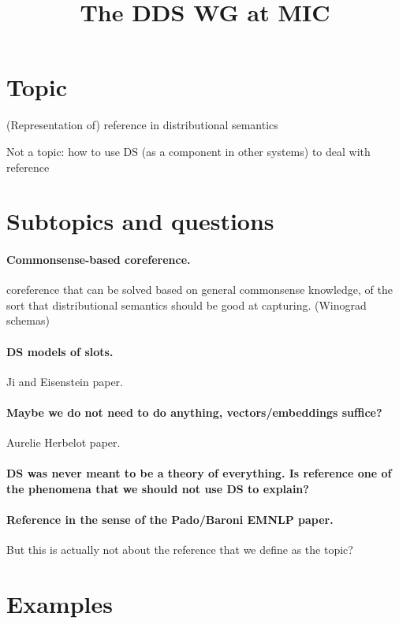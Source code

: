 \documentclass[a4paper,12pt]{article}
\title{The DDS WG at MIC}
\begin{document}
\maketitle

\section{Topic}
(Representation of) reference in distributional semantics

Not a topic: how to use DS (as a component in other systems)
to deal with reference


\section{Subtopics and questions}



\paragraph{Commonsense-based coreference.}
coreference that can be solved based on general commonsense
knowledge, of the sort that distributional semantics should
be good at capturing.
(Winograd schemas)

\paragraph{DS models of slots.} Ji and Eisenstein paper.

\paragraph{Maybe we do not need to do anything,
  vectors/embeddings suffice?} Aurelie Herbelot paper.

\paragraph{DS was never meant to be a theory of
  everything. Is reference one of the phenomena that we
  should not use DS to explain?}

\paragraph{Reference in the sense of the Pado/Baroni EMNLP
  paper.} But this is actually not about the reference that
we define as the topic?


\section{Examples}
\end{document}
